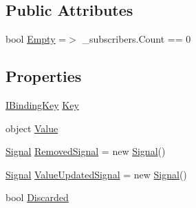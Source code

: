 \subsection*{Public Attributes}
\begin{DoxyCompactItemize}
\item 
bool \mbox{\hyperlink{classcp_games_1_1core_1_1_rapid_m_v_c_1_1impl_1_1_binding_a746307581d56690c0e5234f6cb3f04a5}{Empty}} =$>$ \+\_\+subscribers.\+Count == 0
\end{DoxyCompactItemize}
\subsection*{Properties}
\begin{DoxyCompactItemize}
\item 
\mbox{\hyperlink{interfacecp_games_1_1core_1_1_rapid_m_v_c_1_1_i_binding_key}{I\+Binding\+Key}} \mbox{\hyperlink{classcp_games_1_1core_1_1_rapid_m_v_c_1_1impl_1_1_binding_a6c75caa9e8810b2bf42aa41ee05122af}{Key}}
\item 
object \mbox{\hyperlink{classcp_games_1_1core_1_1_rapid_m_v_c_1_1impl_1_1_binding_a2475a9fdd0df65b35b71437974c5d116}{Value}}
\item 
\mbox{\hyperlink{classcp_games_1_1core_1_1_rapid_m_v_c_1_1_signal}{Signal}} \mbox{\hyperlink{classcp_games_1_1core_1_1_rapid_m_v_c_1_1impl_1_1_binding_a250ddde1caae1342223d266a15cac94a}{Removed\+Signal}} = new \mbox{\hyperlink{classcp_games_1_1core_1_1_rapid_m_v_c_1_1_signal}{Signal}}()
\item 
\mbox{\hyperlink{classcp_games_1_1core_1_1_rapid_m_v_c_1_1_signal}{Signal}} \mbox{\hyperlink{classcp_games_1_1core_1_1_rapid_m_v_c_1_1impl_1_1_binding_a5111c5c62f8b0f061c2f21ff67bfe561}{Value\+Updated\+Signal}} = new \mbox{\hyperlink{classcp_games_1_1core_1_1_rapid_m_v_c_1_1_signal}{Signal}}()
\item 
bool \mbox{\hyperlink{classcp_games_1_1core_1_1_rapid_m_v_c_1_1impl_1_1_binding_a1a24103db604d631562af41e8fc28db8}{Discarded}}
\end{DoxyCompactItemize}


